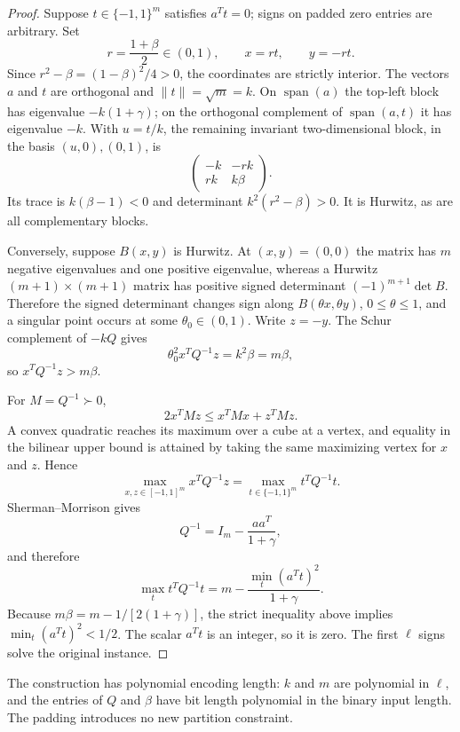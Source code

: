 \begin{proof}
Suppose $t\in\{-1,1\}^m$ satisfies $a^Tt=0$; signs on padded zero entries are
arbitrary. Set
\[
 r=\frac{1+\beta}{2}\in(0,1),\qquad x=rt,\qquad y=-rt.
\]
Since $r^2-\beta=(1-\beta)^2/4>0$, the coordinates are strictly interior.
The vectors $a$ and $t$ are orthogonal and $\|t\|=\sqrt m=k$. On
$\operatorname{span}(a)$ the top-left block has eigenvalue
$-k(1+\gamma)$; on the orthogonal complement of
$\operatorname{span}(a,t)$ it has eigenvalue $-k$. With $u=t/k$, the
remaining invariant two-dimensional block, in the basis $(u,0),(0,1)$, is
\[
 \begin{pmatrix}-k&-rk\\rk&k\beta\end{pmatrix}.
\]
Its trace is $k(\beta-1)<0$ and determinant
$k^2(r^2-\beta)>0$. It is Hurwitz, as are all complementary blocks.

Conversely, suppose $B(x,y)$ is Hurwitz. At $(x,y)=(0,0)$ the matrix has
$m$ negative eigenvalues and one positive eigenvalue, whereas a Hurwitz
$(m+1)\times(m+1)$ matrix has positive signed determinant
$(-1)^{m+1}\det B$. Therefore the signed determinant changes sign along
$B(\theta x,\theta y)$, $0\leq\theta\leq1$, and a singular point occurs at
some $\theta_0\in(0,1)$. Write $z=-y$. The Schur complement of $-kQ$ gives
\[
 \theta_0^2x^TQ^{-1}z=k^2\beta=m\beta,
\]
so $x^TQ^{-1}z>m\beta$.

For $M=Q^{-1}\succ0$,
\[
 2x^TMz\leq x^TMx+z^TMz.
\]
A convex quadratic reaches its maximum over a cube at a vertex, and equality
in the bilinear upper bound is attained by taking the same maximizing vertex
for $x$ and $z$. Hence
\[
 \max_{x,z\in[-1,1]^m}x^TQ^{-1}z
 =\max_{t\in\{-1,1\}^m}t^TQ^{-1}t.
\]
Sherman--Morrison gives
\[
 Q^{-1}=I_m-\frac{aa^T}{1+\gamma},
\]
and therefore
\[
 \max_t t^TQ^{-1}t
 =m-\frac{\min_t(a^Tt)^2}{1+\gamma}.
\]
Because $m\beta=m-1/[2(1+\gamma)]$, the strict inequality above implies
$\min_t(a^Tt)^2<1/2$. The scalar $a^Tt$ is an integer, so it is zero. The
first $\ell$ signs solve the original instance.
\end{proof}

The construction has polynomial encoding length: $k$ and $m$ are polynomial
in $\ell$, and the entries of $Q$ and $\beta$ have bit length polynomial in
the binary input length. The padding introduces no new partition constraint.
